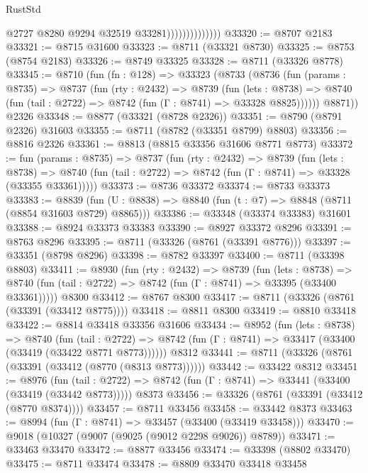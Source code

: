 \begin{lexlean}{RustStd}
\begin{coremodule}
                                @2727
                                @8280
                                @9294
                                @32519
                                @33281))))))))))))))
@33320 := @8707 @2183
@33321 := @8715 @31600
@33323 := @8711 (@33321 @8730)
@33325 := @8753 (@8754 @2183)
@33326 := @8749 @33325
@33328 := @8711 (@33326 @8778)
@33345 := @8710
    (fun (fn : @128) =>
    @33323
      (@8733
        (@8736
          (fun (params : @8735) =>
          @8737
            (fun (rty : @2432) =>
            @8739
              (fun (lets : @8738) =>
              @8740 (fun (tail : @2722) => @8742 (fun (Γ : @8741) => @33328 @8825))))))
        @8871))
    @2326
@33348 := @8877 (@33321 (@8728 @2326))
@33351 := @8790 (@8791 @2326) @31603
@33355 := @8711 (@8782 (@33351 @8799) @8803)
@33356 := @8816 @2326
@33361 := @8813 (@8815 @33356 @31606 @8771 @8773)
@33372 := fun (params : @8735) =>
  @8737
    (fun (rty : @2432) =>
    @8739
      (fun (lets : @8738) =>
      @8740 (fun (tail : @2722) => @8742 (fun (Γ : @8741) => @33328 (@33355 @33361)))))
@33373 := @8736 @33372
@33374 := @8733 @33373
@33383 := @8839
    (fun (U : @8838) => @8840 (fun (t : @7) => @8848 (@8711 (@8854 @31603 @8729) @8865)))
@33386 := @33348 (@33374 @33383) @31601
@33388 := @8924 @33373 @33383
@33390 := @8927 @33372 @8296
@33391 := @8763 @8296
@33395 := @8711 (@33326 (@8761 (@33391 @8776)))
@33397 := @33351 (@8798 @8296)
@33398 := @8782 @33397
@33400 := @8711 (@33398 @8803)
@33411 := @8930
    (fun (rty : @2432) =>
    @8739
      (fun (lets : @8738) =>
      @8740 (fun (tail : @2722) => @8742 (fun (Γ : @8741) => @33395 (@33400 @33361)))))
    @8300
@33412 := @8767 @8300
@33417 := @8711 (@33326 (@8761 (@33391 (@33412 @8775))))
@33418 := @8811 @8300
@33419 := @8810 @33418
@33422 := @8814 @33418 @33356 @31606
@33434 := @8952
    (fun (lets : @8738) =>
    @8740
      (fun (tail : @2722) =>
      @8742 (fun (Γ : @8741) => @33417 (@33400 (@33419 (@33422 @8771 @8773))))))
    @8312
@33441 := @8711 (@33326 (@8761 (@33391 (@33412 (@8770 (@8313 @8773))))))
@33442 := @33422 @8312
@33451 := @8976
    (fun (tail : @2722) => @8742 (fun (Γ : @8741) => @33441 (@33400 (@33419 (@33442 @8773)))))
    @8373
@33456 := @33326 (@8761 (@33391 (@33412 (@8770 @8374))))
@33457 := @8711 @33456
@33458 := @33442 @8373
@33463 := @8994 (fun (Γ : @8741) => @33457 (@33400 (@33419 @33458)))
@33470 := @9018 (@10327 (@9007 (@9025 (@9012 @2298 @9026)) @8789))
@33471 := @33463 @33470
@33472 := @8877 @33456
@33474 := @33398 (@8802 @33470)
@33475 := @8711 @33474
@33478 := @8809 @33470 @33418 @33458

\end{coremodule}
\end{lexlean}
